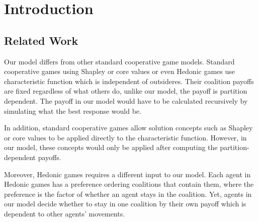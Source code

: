 \section{Introduction}

\subsection*{Related Work}
Our model differs from other standard cooperative game models. Standard cooperative games using Shapley or core values or even Hedonic games use characteristic function which is independent of outsideres. Their coalition payoffs are fixed regardless of what others do, unlike our model, the payoff is partition dependent. The payoff in our model would have to be calculated recursively by simulating what the best response would be. 

In addition, standard cooperative games allow solution concepts such as Shapley or core values to be applied directly to the characteristic function. However, in our model, these concepts would only be applied after computing the partition-dependent payoffs. 

Moreover, Hedonic games requires a different input to our model. Each agent in Hedonic games has a preference ordering coalitions that contain them, where the preference is the factor of whether an agent stays in the coalition. Yet, agents in our model decide whether to stay in one coalition by their own payoff which is dependent to other agents' movements.